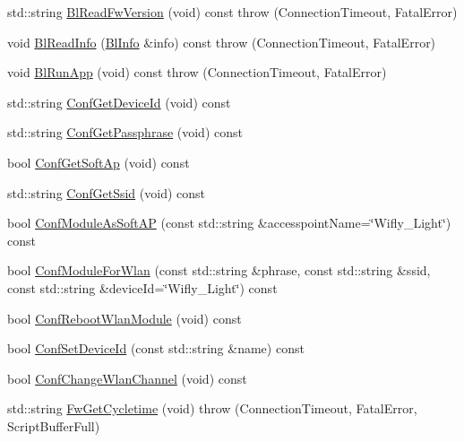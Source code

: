 \begin{DoxyCompactItemize}
\item 
std\-::string \hyperlink{class_wy_light_1_1_control_ac6329ec0b3f87a0a1538d44fb2e06a4d}{Bl\-Read\-Fw\-Version} (void) const   throw (\-Connection\-Timeout, Fatal\-Error)
\item 
void \hyperlink{class_wy_light_1_1_control_a1d5de392ee1bce3176d0840d855eaa1f}{Bl\-Read\-Info} (\hyperlink{struct_wy_light_1_1_bl_info}{Bl\-Info} \&info) const   throw (\-Connection\-Timeout, Fatal\-Error)
\item 
void \hyperlink{class_wy_light_1_1_control_a6a515497781d7ab7ad5fde04b5466c63}{Bl\-Run\-App} (void) const   throw (\-Connection\-Timeout, Fatal\-Error)
\item 
std\-::string \hyperlink{class_wy_light_1_1_control_a32fce52c7c113c90654e6835c0274f73}{Conf\-Get\-Device\-Id} (void) const 
\item 
std\-::string \hyperlink{class_wy_light_1_1_control_adc559100e686136cff2c3bfea53f55a3}{Conf\-Get\-Passphrase} (void) const 
\item 
bool \hyperlink{class_wy_light_1_1_control_a08764c74e17d008cf9e03ae6c9a145e0}{Conf\-Get\-Soft\-Ap} (void) const 
\item 
std\-::string \hyperlink{class_wy_light_1_1_control_a9128e80172dcb8586c9821dc7587f122}{Conf\-Get\-Ssid} (void) const 
\item 
bool \hyperlink{class_wy_light_1_1_control_a16a660f58bf48a006e1709a28ebc2ae8}{Conf\-Module\-As\-Soft\-A\-P} (const std\-::string \&accesspoint\-Name=\char`\"{}Wifly\-\_\-\-Light\char`\"{}) const 
\item 
bool \hyperlink{class_wy_light_1_1_control_a801a17d49dc76e80a2a8ea8709e4d6f5}{Conf\-Module\-For\-Wlan} (const std\-::string \&phrase, const std\-::string \&ssid, const std\-::string \&device\-Id=\char`\"{}Wifly\-\_\-\-Light\char`\"{}) const 
\item 
bool \hyperlink{class_wy_light_1_1_control_aa9ac31328f888ff1d90cefe04f7353e6}{Conf\-Reboot\-Wlan\-Module} (void) const 
\item 
bool \hyperlink{class_wy_light_1_1_control_aa829e0a757758eb960da902803b138d8}{Conf\-Set\-Device\-Id} (const std\-::string \&name) const 
\item 
bool \hyperlink{class_wy_light_1_1_control_a9079d8f3560a5c811bf97b138ad12155}{Conf\-Change\-Wlan\-Channel} (void) const 
\item 
std\-::string \hyperlink{class_wy_light_1_1_control_aedce9e77a3358f551cc66c4a8a492260}{Fw\-Get\-Cycletime} (void)  throw (\-Connection\-Timeout, Fatal\-Error, Script\-Buffer\-Full)

\end{DoxyCompactItemize}
